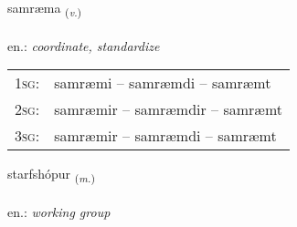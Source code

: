 \documentclass[frontgrid, backgrid]{flacards}\usepackage[]{graphicx}\usepackage[]{xcolor}
\begin{document}
\renewcommand{\flhead}{\vskip5pt \fboxsep=0pt {\small\bfseries\footnotesize Sagnorð | Verb}}
\renewcommand{\fcfoot}{\vskip5pt \fboxsep=0pt \hspace{2pt}{\small\bfseries\footnotesize 2K}}

\renewcommand{\blhead}{\vskip5pt {\small\bfseries\footnotesize Sagnorð | Verb }}
\renewcommand{\bcfoot}{\vskip5pt \hspace{2pt}{\small\bfseries\footnotesize 2K}}


{samræma \small{\textsubscript{(\textit{v.})}} \\[1ex] %
\textphonetic{[samraima]} \\
en.: \emph{coordinate, standardize} \\  [2ex]
\renewcommand*{\arraystretch}{0.8}
\begin{tabular}{p{1cm}l}
\textsc{1sg}: & samræmi -- samræmdi -- samræmt \\ 
\textsc{2sg}: & samræmir -- samræmdir -- samræmt \\ 
\textsc{3sg}: & samræmir -- samræmdi -- samræmt \\ 
\end{tabular}
}

\renewcommand{\flhead}{\vskip5pt \fboxsep=0pt {\small\bfseries\footnotesize Nafnorð | Noun}}
\renewcommand{\fcfoot}{\vskip5pt \fboxsep=0pt \hspace{2pt}{\small\bfseries\footnotesize 2K}}

\renewcommand{\blhead}{\vskip5pt {\small\bfseries\footnotesize Nafnorð | Noun }}
\renewcommand{\bcfoot}{\vskip5pt \hspace{2pt}{\small\bfseries\footnotesize 2K}}


{starfshópur \small{\textsubscript{(\textit{m.})}} \\[1ex] %
\textphonetic{[starfshoupʏr]} \\
en.: \emph{working group} \\  [2ex]
\renewcommand*{\arraystretch}{0.8}
}
\end{document}
